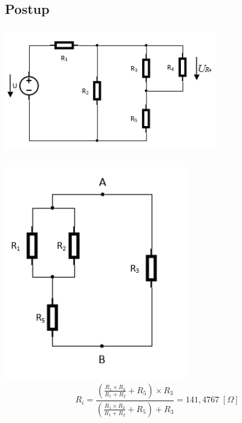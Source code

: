 \documentclass[a4paper,12pt]{article}
\begin{document}
	\subsection{Postup}
		\subsubsection{} %
			\includegraphics[width=350px]{2_1.png}
		\subsubsection{} %
			\includegraphics[width=300px]{2_3.png}
			\begin{equation}
				R_{i} = \frac{(\frac{R_1 \times R_2}{R_1 + R_2} + R_5) \times R_3}{(\frac{R_1 \times R_2}{R_1 + R_2} + R_5) + R_3} = 141,4767 \;[\Omega] \nonumber
			\end{equation}
\end{document}
